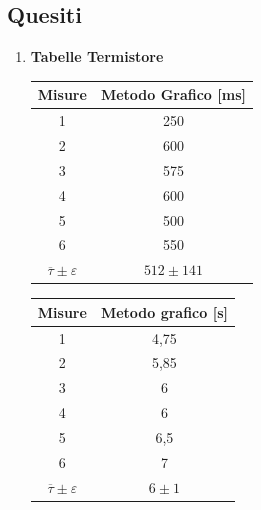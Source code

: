 \documentclass[a4paper, 12pt, twoside]{report}
\newcommand{\ra}[1]{\renewcommand{\arraystretch}{#1}} %
\begin{document}
		\subsection{Quesiti}
		\begin{enumerate}
			\item \textbf{Tabelle Termistore}	
					
				\begin{table}[H]
					\centering
					\ra{1.3}
					\label{tab:title4} 				
				\begin{tabular}{cc}
					\toprule
					\textbf{Misure}                 & \textbf{Metodo Grafico} [ms] \\ \midrule
					1                               & 250                  \\ 
					2                               & 600                  \\ 
					3                               & 575                  \\ 
					4                               & 600                  \\ 
					5                               & 500                  \\ 
					6                               & 550                  \\ 
					$\overline{\tau}\pm\varepsilon$ & $ 512\pm141 $        \\ \bottomrule 
				\end{tabular}			
			\end{table}
		
			\begin{table}[H]
				\centering
				\ra{1.3}
				\label{tab:title5} 
		\begin{center}
			\begin{tabular}{cc}
				\toprule
				\textbf{Misure}                 & \textbf{Metodo grafico} [s] \\ \midrule
				1                               & 4,75                \\ 
				2                               & 5,85                \\ 
				3                               & 6                   \\ 
				4                               & 6                   \\ 
				5                               & 6,5                 \\ 
				6                               & 7                   \\ 
				$\overline{\tau}\pm\varepsilon$ & $ 6\pm1 $           \\	\bottomrule 
			\end{tabular}
		\end{center}
		\end{table}
	

\end{enumerate}
\end{document}
